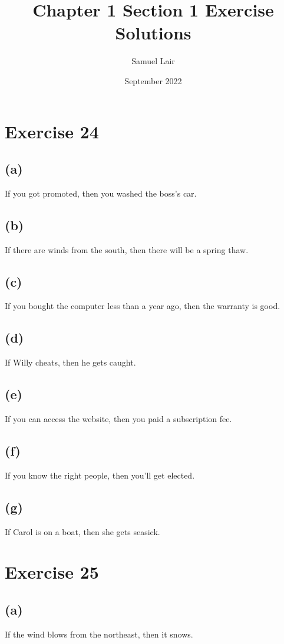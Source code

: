 \documentclass{article}
\title{Chapter 1 Section 1 Exercise Solutions}
\author{Samuel Lair}
\date{September 2022}
\begin{document}
\maketitle
\tableofcontents

\pagebreak

\section{Exercise 24}
\subsection{(a)}
If you got promoted, then you washed the boss's car.
\subsection{(b)}
If there are winds from the south, then there will be a spring thaw.
\subsection{(c)}
If you bought the computer less than a year ago, then the warranty is good.
\subsection{(d)}
If Willy cheats, then he gets caught.
\subsection{(e)}
If you can access the website, then you paid a subscription fee.
\subsection{(f)}
If you know the right people, then you'll get elected.
\subsection{(g)}
If Carol is on a boat, then she gets seasick.

\pagebreak

\section{Exercise 25}
\subsection{(a)}
If the wind blows from the northeast, then it snows.
\end{document}
